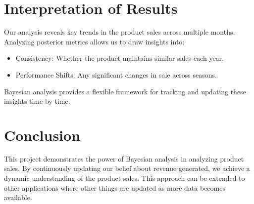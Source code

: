 \section{Interpretation of Results}

    Our analysis reveals key trends in the product sales across multiple months.
    Analyzing posterior metrics allows us to draw insights into:
    \begin{itemize}
        \item Consistency: Whether the product maintains similar sales each year.
        \item Performance Shifts: Any significant changes in sale across seasons.
    \end{itemize}
    Bayesian analysis provides a flexible framework for tracking and updating these insights time by time.

\section{Conclusion}

    This project demonstrates the power of Bayesian analysis in analyzing product sales.
    By continuously updating our belief about revenue generated, we achieve a dynamic understanding of the product sales.
    This approach can be extended to other applications where other things are updated as more data becomes available.